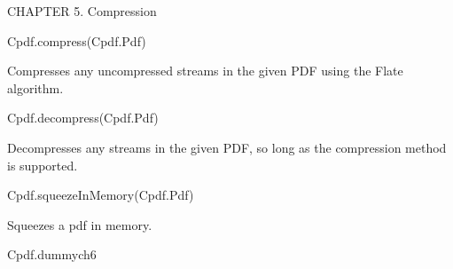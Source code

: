 CHAPTER 5. Compression

Cpdf.compress(Cpdf.Pdf)


Compresses any uncompressed streams in the given PDF
using the Flate algorithm.


Cpdf.decompress(Cpdf.Pdf)


Decompresses any streams in the given PDF, so long as
the compression method is supported.


Cpdf.squeezeInMemory(Cpdf.Pdf)


Squeezes a pdf in memory.


Cpdf.dummych6

